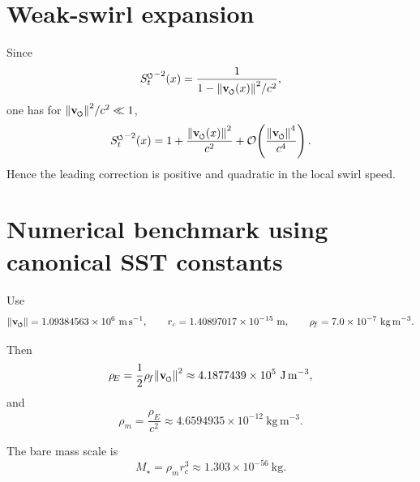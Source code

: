 \documentclass[11pt,a4paper]{article}
\newcommand{\swirlarrow}{\mathchoice{\mkern-2mu\scriptstyle\boldsymbol{\circlearrowleft}}{\mkern-2mu\scriptstyle\boldsymbol{\circlearrowleft}}{\mkern-2mu\scriptscriptstyle\boldsymbol{\circlearrowleft}}{\mkern-2mu\scriptscriptstyle\boldsymbol{\circlearrowleft}}}
\newcommand{\vswirl}{{\mathbf{v}_{\swirlarrow}}}
\newcommand{\SwirlClock}{{S_t^{\swirlarrow}}}
\newcommand{\rhoF}{\rho_{\!f}}
\newcommand{\rhoE}{\rho_{\!E}}
\newcommand{\rhoM}{\rho_{\!m}}
\providecommand{\rc}{r_c}
\begin{document}
        \section{Weak-swirl expansion}
            
            Since
            \begin{equation}
                \SwirlClock^{-2}(x)= \frac{1}{1-\norm{\vswirl(x)}^2/c^2},
            \end{equation}
            one has for \(\norm{\vswirl}^2/c^2\ll 1\),
            \begin{equation}
                \SwirlClock^{-2}(x)
                =
                1+\frac{\norm{\vswirl(x)}^2}{c^2}
                +\mathcal O\!\left(\frac{\norm{\vswirl}^4}{c^4}\right).
            \end{equation}
            Hence the leading correction is positive and quadratic in the local swirl speed.
        
        \section{Numerical benchmark using canonical SST constants}
            
            Use
            \begin{equation}
                \norm{\vswirl}=1.09384563\times 10^6\ \mathrm{m\,s^{-1}},
                \qquad
                \rc=1.40897017\times 10^{-15}\ \mathrm{m},
                \qquad
                \rhoF=7.0\times 10^{-7}\ \mathrm{kg\,m^{-3}}.
            \end{equation}
            
            Then
            \begin{equation}
                \rhoE=\frac12 \rhoF \norm{\vswirl}^2
                \approx 4.1877439\times 10^5\ \mathrm{J\,m^{-3}},
            \end{equation}
            and
            \begin{equation}
                \rhoM=\frac{\rhoE}{c^2}
                \approx 4.6594935\times 10^{-12}\ \mathrm{kg\,m^{-3}}.
            \end{equation}
            
            The bare mass scale is
            \begin{equation}
                M_\star=\rhoM \rc^3 \approx 1.303\times 10^{-56}\ \mathrm{kg}.
            \end{equation}
            
\end{document}
